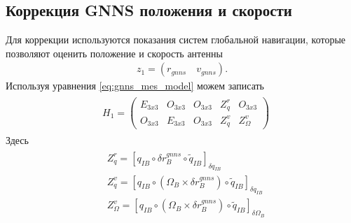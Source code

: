 \documentclass[a4paper,12pt]{article}
\begin{document}
\subsection{Коррекция GNNS положения и скорости}
Для коррекции используются показания систем глобальной навигации, которые позволяют оценить положение и скорость антенны
\begin{align}
z_1 = (r_{gnns} \quad v_{gnns}).
\end{align}
Используя уравнения \eqref{eq:gnns_mes_model} можем записать 
\begin{align}
\begin{split}
&H_1 =
\begin{pmatrix}
E_{3x3} & O_{3x3} & O_{3x3} & Z^r_q & O_{3x3}   \\
O_{3x3} & E_{3x3} & O_{3x3} & Z^v_q & Z^v_{\Omega}
\end{pmatrix}
\end{split}
\end{align}
Здесь
\begin{align}
\begin{split}
&Z^r_q = [q_{IB} \circ \delta r^{gnns}_B \circ \tilde{q}_{IB}]_{\delta q_{IB}} \\
&Z^v_q = [q_{IB} \circ  (\Omega_B \times \delta r^{gnns}_B) \circ \tilde{q}_{IB}]_{\delta q_{IB}} \\
&Z^v_\Omega = [q_{IB} \circ  (\Omega_B \times \delta r^{gnns}_B) \circ \tilde{q}_{IB}]_{\delta \Omega_B}
\end{split}
\end{align}
\end{document}
